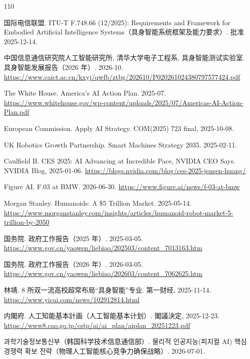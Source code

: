 \documentclass[10pt,fontset=fandol]{ctexart}
\begin{document}
\begin{thebibliography}{110}\small

国际电信联盟. ITU-T F.748.66 (12/2025): Requirements and Framework for Embodied Artificial Intelligence Systems（具身智能系统框架及能力要求）. 批准 2025-12-14.

中国信息通信研究院人工智能研究所, 清华大学电子工程系, 具身智能测试实验室. 具身智能发展报告（2026 年）. 2026-10. \url{https://www.caict.ac.cn/kxyj/qwfb/ztbg/202610/P020261024380797577424.pdf}

The White House. America's AI Action Plan. 2025-07. \url{https://www.whitehouse.gov/wp-content/uploads/2025/07/Americas-AI-Action-Plan.pdf}

European Commission. Apply AI Strategy. COM(2025) 723 final, 2025-10-08.

UK Robotics Growth Partnership. Smart Machines Strategy 2035. 2025-02-11.

Caulfield B. CES 2025: AI Advancing at Incredible Pace, NVIDIA CEO Says. NVIDIA Blog, 2025-01-06. \url{https://blogs.nvidia.com/blog/ces-2025-jensen-huang/}

Figure AI. F.03 at BMW. 2026-06-30. \url{https://www.figure.ai/news/f-03-at-bmw}

Morgan Stanley. Humanoids: A \$5 Trillion Market. 2025-05-14. \url{https://www.morganstanley.com/insights/articles/humanoid-robot-market-5-trillion-by-2050}

国务院. 政府工作报告（2025 年）. 2025-03-05. \url{https://www.gov.cn/yaowen/liebiao/202503/content\_7013163.htm}

国务院. 政府工作报告（2026 年）. 2026-03-05. \url{https://www.gov.cn/yaowen/liebiao/202603/content\_7062625.htm}

林靖. 8 所双一流高校超常布局“具身智能”专业. 第一财经, 2025-11-14. \url{https://www.yicai.com/news/102912814.html}

{\jafont 内閣府. 人工知能基本計画}（人工智能基本计划）. {\jafont 閣議決定}, 2025-12-23. \url{https://www8.cao.go.jp/cstp/ai/ai\_plan/aiplan\_20251223.pdf}

{\hangulfont 과학기술정보통신부}（韩国科学技术信息通信部）. {\hangulfont 물리적 인공지능(피지컬 AI) 핵심 경쟁력 확보 전략}（物理人工智能核心竞争力确保战略）. 2026-07-01.


\end{thebibliography}
\end{document}
